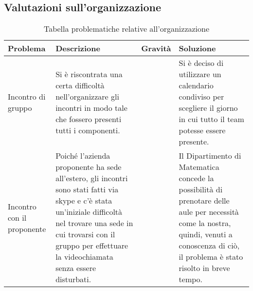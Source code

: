 \subsection{Valutazioni sull'organizzazione}
\begin{table}[H]
	
	\begin{longtable}{ >{\centering}p{} >{\centering}p{}
			>{\centering}p{} >{\centering}p{}}
			
		\hline
		\rowcolorhead
		\textbf{\color{white}Problema} 
		& \textbf{\color{white}Descrizione} 
		& \centering\textbf{\color{white}Gravità}
		& \textbf{\color{white}Soluzione} 
		\tabularnewline \hline 	
		
		Incontro di gruppo &
		Si è riscontrata una certa difficoltà nell'organizzare gli incontri in modo
		tale che fossero presenti tutti i componenti. &
		2 &
		Si è deciso di utilizzare un calendario condiviso per scegliere il giorno
		in cui tutto il team potesse essere presente. 
				
		\tabularnewline 
		Incontro con il proponente &
		Poiché l'azienda proponente ha sede all'estero, gli incontri sono stati fatti 
		via skype e c'è stata un'iniziale difficoltà nel trovare una sede in cui 
		trovarsi con il gruppo per effettuare la videochiamata senza essere disturbati. &
		1 &
		Il Dipartimento di Matematica concede la possibilità di prenotare delle aule
		per necessità come la nostra, quindi, venuti a conoscenza di ciò, il problema 
		è stato risolto in breve tempo.
			
	\end{longtable}
	\caption{Tabella problematiche relative all'organizzazione}	
\end{table}

